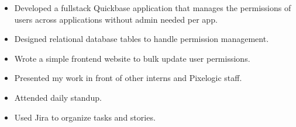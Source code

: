 \begin{itemize}
  \item Developed a fullstack Quickbase application that manages the permissions of users across applications without admin needed per app.
  \item Designed relational database tables to handle permission management.
  \item Wrote a simple frontend website to bulk update user permissions.
  \item Presented my work in front of other interns and Pixelogic staff.
  \item Attended daily standup.
  \item Used Jira to organize tasks and stories.
\end{itemize}
\vspace{4pt}
